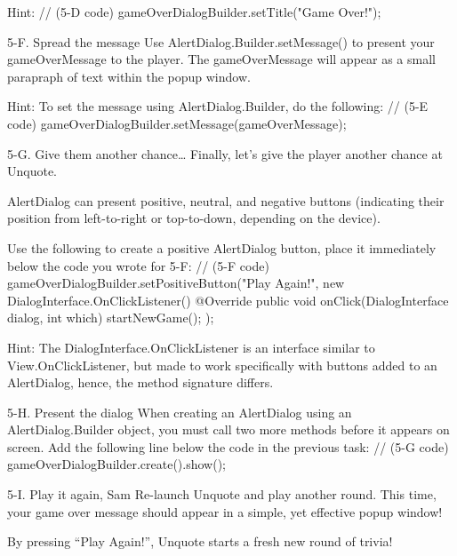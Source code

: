                         Hint: // (5-D code)
                        gameOverDialogBuilder.setTitle("Game Over!");
        
        5-F. Spread the message
                Use AlertDialog.Builder.setMessage() to present your gameOverMessage to the player. The gameOverMessage will appear as a small parapraph of text within the popup window.

                        Hint: To set the message using AlertDialog.Builder, do the following:
                        // (5-E code)
                        gameOverDialogBuilder.setMessage(gameOverMessage);

        5-G. Give them another chance…
                Finally, let’s give the player another chance at Unquote.

                AlertDialog can present positive, neutral, and negative buttons (indicating their position from left-to-right or top-to-down, depending on the device).

                Use the following to create a positive AlertDialog button, place it immediately below the code you wrote for 5-F:
                        // (5-F code)
                        gameOverDialogBuilder.setPositiveButton("Play Again!", new DialogInterface.OnClickListener() {
                                @Override
                                public void onClick(DialogInterface dialog, int which) {
                                        startNewGame();
                                }
                        });

                        Hint: The DialogInterface.OnClickListener is an interface similar to View.OnClickListener, but made to work specifically with buttons added to an AlertDialog, hence, the method signature differs.

        5-H. Present the dialog
                When creating an AlertDialog using an AlertDialog.Builder object, you must call two more methods before it appears on screen. Add the following line below the code in the previous task:
                        // (5-G code)
                        gameOverDialogBuilder.create().show();
        
        5-I. Play it again, Sam
                Re-launch Unquote and play another round. This time, your game over message should appear in a simple, yet effective popup window!

                By pressing “Play Again!”, Unquote starts a fresh new round of trivia!

